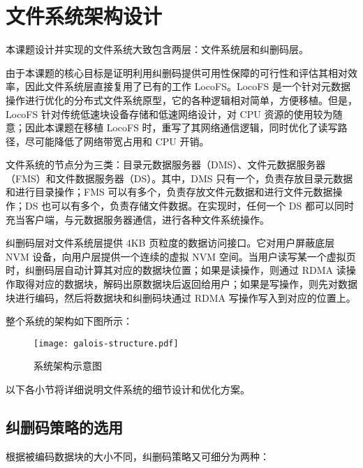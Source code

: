 
\chapter{文件系统架构设计}
\label{cha:design}


本课题设计并实现的文件系统大致包含两层：文件系统层和纠删码层。

由于本课题的核心目标是证明利用纠删码提供可用性保障的可行性和评估其相对效率，因此文件系统层直接复用了已有的工作 LocoFS\cite{li2017}。LocoFS 是一个针对元数据操作进行优化的分布式文件系统原型，它的各种逻辑相对简单，方便移植。但是，LocoFS 针对传统低速块设备存储和低速网络设计，对 CPU 资源的使用较为随意；因此本课题在移植 LocoFS 时，重写了其网络通信逻辑，同时优化了读写路径，尽可能降低了网络带宽占用和 CPU 开销。

文件系统的节点分为三类：目录元数据服务器（DMS）、文件元数据服务器（FMS）和文件数据服务器（DS）。其中，DMS 只有一个，负责存放目录元数据和进行目录操作；FMS 可以有多个，负责存放文件元数据和进行文件元数据操作；DS 也可以有多个，负责存储文件数据。在实现时，任何一个 DS 都可以同时充当客户端，与元数据服务器通信，进行各种文件系统操作。

纠删码层对文件系统层提供 4KB 页粒度的数据访问接口。它对用户屏蔽底层 NVM 设备，向用户层提供一个连续的虚拟 NVM 空间。当用户读写某一个虚拟页时，纠删码层自动计算其对应的数据块位置；如果是读操作，则通过 RDMA 读操作取得对应的数据块，解码出原数据块后返回给用户；如果是写操作，则先对数据块进行编码，然后将数据块和纠删码块通过 RDMA 写操作写入到对应的位置上。

整个系统的架构如下图所示：

\begin{figure}[H]
    \centering
    \texttt{[image: galois-structure.pdf]}
    \caption{系统架构示意图}
    \label{fig:struct}
\end{figure}

以下各小节将详细说明文件系统的细节设计和优化方案。

\section{纠删码策略的选用}

根据被编码数据块的大小不同，纠删码策略又可细分为两种：

